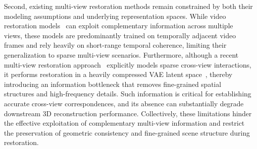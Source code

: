 Second, existing multi-view restoration methods remain constrained by both their modeling assumptions and underlying representation spaces. While video restoration models~\cite{liang2024vrt, Youk_2024_CVPR} can exploit complementary information across multiple views, these models are predominantly trained on temporally adjacent video frames and rely heavily on short-range temporal coherence, limiting their generalization to sparse multi-view scenarios. Furthermore, although a recent multi-view restoration approach~\cite{mao2025sir} explicitly models sparse cross-view interactions, it performs restoration in a heavily compressed VAE latent space~\cite{kingma2013auto}, thereby introducing an information bottleneck that removes fine-grained spatial structures and high-frequency details. Such information is critical for establishing accurate cross-view correspondences, and its absence can substantially degrade downstream 3D reconstruction performance. Collectively, these limitations hinder the effective exploitation of complementary multi-view information and restrict the preservation of geometric consistency and fine-grained scene structure during restoration.





